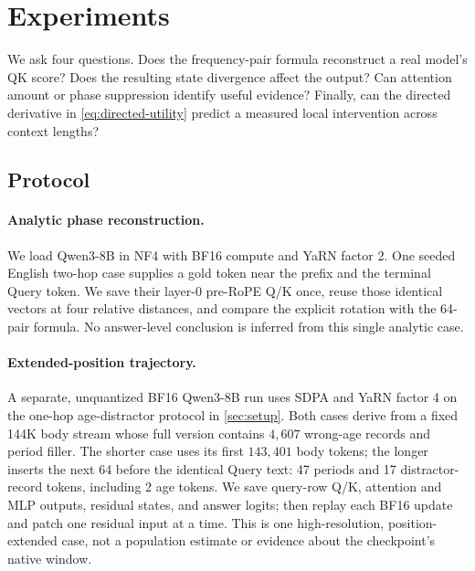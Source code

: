 \section{Experiments}
\label{sec:experiments}

We ask four questions.  Does the frequency-pair formula reconstruct a real
model's QK score?  Does the resulting state divergence affect the output?  Can
attention amount or phase suppression identify useful evidence?  Finally, can
the directed derivative in \cref{eq:directed-utility} predict a measured local
intervention across context lengths?

\subsection{Protocol}

\paragraph{Analytic phase reconstruction.}
We load Qwen3-8B in NF4 with BF16 compute and YaRN factor 2.  One seeded English
two-hop case supplies a gold token near the prefix and the terminal Query token.
We save their layer-0 pre-RoPE Q/K once, reuse those identical vectors at four
relative distances, and compare the explicit rotation with the 64-pair formula.
No answer-level conclusion is inferred from this single analytic case.

\paragraph{Extended-position trajectory.}
A separate, unquantized BF16 Qwen3-8B run uses SDPA and YaRN factor 4 on the
one-hop age-distractor protocol in \cref{sec:setup}.  Both cases derive from a
fixed 144K body stream whose full version contains $4{,}607$ wrong-age records
and period filler.  The shorter case uses its first $143{,}401$ body tokens;
the longer inserts the next 64 before the identical Query text: 47 periods and
17 distractor-record tokens, including 2 age tokens.  We save query-row Q/K, attention and MLP outputs,
residual states, and answer logits; then replay each BF16 update and patch one
residual input at a time.  This is one high-resolution, position-extended case,
not a population estimate or evidence about the checkpoint's native window.

